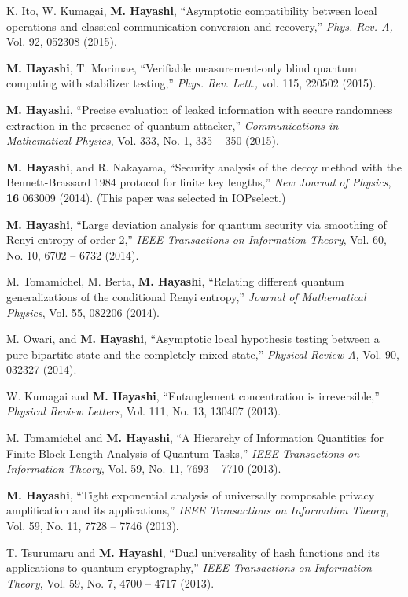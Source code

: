 \documentclass[a4paper,12pt,oneside]{article}
\begin{document}
\begin{enumerate}
K. Ito, W. Kumagai, \textbf{M. Hayashi}, ``Asymptotic compatibility between local operations and classical communication conversion and recovery,'' 
{\em Phys. Rev. A,} Vol. 92, 052308 (2015). 

\textbf{M. Hayashi}, T. Morimae, ``Verifiable measurement-only blind quantum computing with stabilizer testing,'' 
{\em Phys. Rev. Lett.,} vol. 115, 220502 (2015). 

\textbf{M. Hayashi},
``Precise evaluation of leaked information with secure randomness extraction in the
presence of quantum attacker,'' {\em Communications in Mathematical Physics},
Vol. 333, No. 1, 335 -- 350 (2015).

\textbf{M. Hayashi}, and R. Nakayama, 
``Security analysis of the decoy method with the Bennett-Brassard 1984 protocol for finite key lengths,'' 
{\em New Journal of Physics}, {\bf 16} 063009 (2014).
(This paper was selected in IOPselect.)

\textbf{M. Hayashi}, 
``Large deviation analysis for quantum security via smoothing of Renyi entropy of order 2,'' 
{\em IEEE Transactions on Information Theory},
 Vol. 60,  No. 10, 6702 -- 6732 (2014).

M. Tomamichel, M. Berta, \textbf{M. Hayashi},
``Relating different quantum generalizations of the conditional
Renyi entropy,'' 
{\em Journal of Mathematical Physics}, Vol. 55, 082206 (2014).

M. Owari, and \textbf{M. Hayashi},
``Asymptotic local hypothesis testing between a pure bipartite state and the
completely mixed state,''
{\em Physical Review A}, Vol. 90, 032327 (2014).

W. Kumagai and \textbf{M. Hayashi}, 
``Entanglement concentration is irreversible,''
{\em Physical Review Letters}, Vol. 111, No. 13, 130407 (2013).

M. Tomamichel and \textbf{M. Hayashi}, 
``A Hierarchy of Information Quantities for Finite Block Length Analysis of Quantum Tasks,''
{\em IEEE Transactions on Information Theory},
 Vol. 59,  No. 11, 7693 -- 7710 (2013).

\textbf{M. Hayashi}, 
``Tight exponential analysis of universally composable privacy amplification and its applications,''
{\em IEEE Transactions on Information Theory},
 Vol. 59,  No. 11, 7728 -- 7746 (2013).

T. Tsurumaru and \textbf{M. Hayashi}, 
``Dual universality of hash functions and its applications to quantum cryptography,''
{\em IEEE Transactions on Information Theory},
Vol. 59, No. 7, 4700 -- 4717 (2013). 


\end{enumerate}
\end{document}
